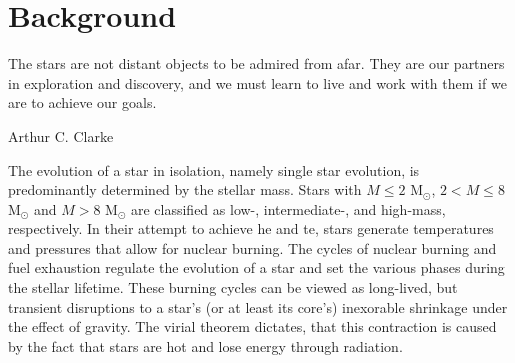 \chapter{Background}\label{background}

\epigraph{The stars are not distant objects to be admired from afar. They are our partners in exploration and discovery, and we must learn to live and work with them if we are to achieve our goals.}{Arthur C. Clarke}

The evolution of a star in isolation, namely single star evolution, is predominantly determined by the stellar mass. Stars with $M \leq 2$ M$_{\odot}$, $2 < M \leq 8$ M$_{\odot}$ and $M > 8$ M$_{\odot}$ are classified as low-, intermediate-, and high-mass, respectively. In their attempt to achieve \ac{he} and \ac{te}, stars generate temperatures and pressures that allow for nuclear burning. The cycles of nuclear burning and fuel exhaustion regulate the evolution of a star and set the various phases during the stellar lifetime. These burning cycles can be viewed as long-lived, but transient disruptions to a star's (or at least its core's) inexorable shrinkage under the effect of gravity. The virial theorem dictates, that this contraction is caused by the fact that stars are hot and lose energy through radiation. 










